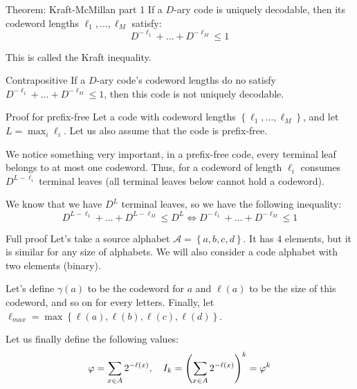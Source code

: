 \documentclass[a4paper]{article}
\begin{document}
\begin{parag}{Theorem: Kraft-McMillan part 1}
    If a $D$-ary code is uniquely decodable, then its codeword lengths $\ell_1, \ldots, \ell_M$ satisfy: 
    \[D^{-\ell_1} + \ldots + D^{-\ell_M} \leq 1\]

    This is called the Kraft inequality.
    
    \begin{subparag}{Contrapositive}
        If a $D$-ary code's codeword lengths do no satisfy $D^{-\ell_1} + \ldots + D^{-\ell_M} \leq 1$, then this code is not uniquely decodable.
    \end{subparag}
    
    \begin{subparag}{Proof for prefix-free}
        Let a code with codeword lengths $\left\{\ell_1, \ldots, \ell_M\right\}$, and let $L = \max_i \ell_i$. Let us also assume that the code is prefix-free.

        We notice something very important, in a prefix-free code, every terminal leaf belongs to at most one codeword. Thus, for a codeword of length $\ell_i$ consumes $D^{L - \ell_i}$ terminal leaves (all terminal leaves below cannot hold a codeword).

        We know that we have $D^L$ terminal leaves, so we have the following inequality: 
        \[D^{L - \ell_1} + \ldots + D^{L - \ell_M} \leq D^{L} \iff D^{-\ell_1} + \ldots + D^{-\ell_M} \leq 1\]
    \end{subparag}
    
    \begin{subparag}{Full proof}
        Let's take a source alphabet $\mathcal{A} = \left\{a, b, c, d\right\}$. It has 4 elements, but it is similar for any size of alphabets. We will also consider a code alphabet with two elements (binary).

        Let's define $\gamma\left(a\right)$ to be the codeword for $a$ and $\ell\left(a\right)$ to be the size of this codeword, and so on for every letters. Finally, let $\ell_{max} = \max\left\{\ell\left(a\right), \ell\left(b\right), \ell\left(c\right), \ell\left(d\right)\right\}$.

        Let us finally define the following values: 
        \[\phi = \sum_{x \in A}^{} 2^{-\ell\left(x\right)}, \mathspace I_k = \left(\sum_{x \in A}^{} 2^{-\ell\left(x\right)}\right)^k = \phi^k\]
        

\end{subparag}
\end{parag}
\end{document}
